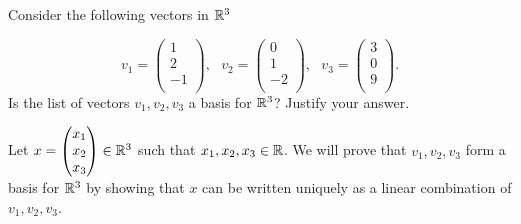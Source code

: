 \begin{question}
    \normalfont
    Consider the following vectors in $\mathbb R^3$

    $$ v_1 =  \left( \begin{array}{c}
                1  \\
                2  \\
                -1 \\
            \end{array} \right),\ \ \   v_2 =  \left( \begin{array}{c}
                0  \\
                1  \\
                -2 \\
            \end{array}\right), \ \ \
        v_3 =  \left( \begin{array}{c}
                3 \\
                0 \\
                9 \\
            \end{array} \right). $$
    Is the list of vectors $v_1, v_2, v_3$ \hspace{.1cm} a basis for $\mathbb R^3$? Justify your answer.

\end{question}

\begin{sol}
    Let $x=\begin{pmatrix} x_1\\ x_2\\ x_3\end{pmatrix}\in\mathbb R^3$ such that $x_1,x_2,x_3\in\mathbb R$. We will prove that $v_1,v_2,v_3$ form a basis for $\mathbb R^3$ by showing that $x$ can be written uniquely as a linear combination of $v_1,v_2,v_3$.

    
\end{sol}